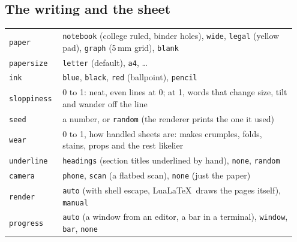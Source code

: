 \documentclass[11pt]{article}
\newcommand{\opt}[1]{\texttt{#1}}
\begin{document}
\subsection*{The writing and the sheet}
\begin{tabular}{@{}p{0.17\linewidth}p{0.78\linewidth}@{}}
\toprule
\opt{paper} & \opt{notebook} (college ruled, binder holes), \opt{wide}, \opt{legal} (yellow pad), \opt{graph} (5\,mm grid), \opt{blank}\\
\opt{papersize} & \opt{letter} (default), \opt{a4}, \dots\\
\opt{ink} & \opt{blue}, \opt{black}, \opt{red} (ballpoint), \opt{pencil}\\
\opt{sloppiness} & 0 to 1: neat, even lines at 0; at 1, words that change size, tilt and wander off the line\\
\opt{seed} & a number, or \opt{random} (the renderer prints the one it used)\\
\opt{wear} & 0 to 1, how handled sheets are: makes crumples, folds, stains, props and the rest likelier\\
\opt{underline} & \opt{headings} (section titles underlined by hand), \opt{none}, \opt{random}\\
\opt{camera} & \opt{phone}, \opt{scan} (a flatbed scan), \opt{none} (just the paper)\\
\opt{render} & \opt{auto} (with shell escape, Lua\LaTeX\ draws the pages itself), \opt{manual}\\
\opt{progress} & \opt{auto} (a window from an editor, a bar in a terminal), \opt{window}, \opt{bar}, \opt{none}\\
\bottomrule
\end{tabular}
\end{document}
